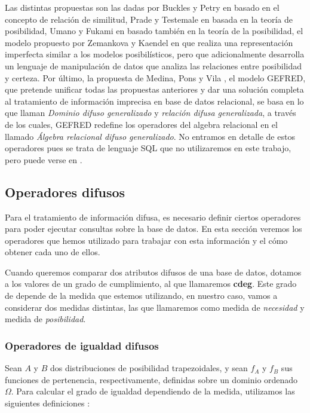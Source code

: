 Las distintas propuestas son las dadas por Buckles y Petry en \cite{buckles, buckles2, buckles3} basado en el concepto de relación de similitud, Prade y Testemale en \cite{prade, prade2, prade3, prade4} basada en la teoría de posibilidad, Umano y Fukami en \cite{fukami, fukami2, fukami3, fukami4} basado también en la teoría de la posibilidad, el modelo propuesto por Zemankova y Kaendel en \cite{zemankova, zemankova2} que realiza una representación imperfecta similar a los modelos posibilísticos, pero que adicionalmente desarrolla un lenguaje de manipulación de datos que analiza las relaciones entre posibilidad y certeza. Por último, la propuesta de Medina, Pons y Vila \cite{gefred}, el modelo GEFRED, que pretende unificar todas las propuestas anteriores y dar una solución completa al tratamiento de información imprecisa en base de datos relacional, se basa en lo que llaman \textit{Dominio difuso generalizado} y \textit{relación difusa generalizada}, a través de los cuales, GEFRED redefine los operadores del algebra relacional en el llamado \textit{Álgebra relacional difuso generalizado}. No entramos en detalle de estos operadores pues se trata de lenguaje SQL que no utilizaremos en este trabajo, pero puede verse en \cite{gefred}.

\subsection{Operadores difusos}\label{cdeg}

Para el tratamiento de información difusa, es necesario definir ciertos operadores para poder ejecutar consultas sobre la base de datos. En esta sección veremos los operadores que hemos utilizado para trabajar con esta información y el cómo obtener cada uno de ellos.

Cuando queremos comparar dos atributos difusos de una base de datos, dotamos a los valores de un grado de cumplimiento, al que llamaremos \textbf{cdeg}. Este grado de depende de la medida que estemos utilizando, en nuestro caso, vamos a considerar dos medidas distintas, las que llamaremos como medida de \textit{necesidad} y medida de \textit{posibilidad}.

\subsubsection{Operadores de igualdad difusos}

Sean $A$ y $B$ dos distribuciones de posibilidad trapezoidales, y sean $f_A$ y $f_B$ sus funciones de pertenencia, respectivamente, definidas sobre un dominio ordenado $\Omega$. Para calcular el grado de igualdad dependiendo de la medida, utilizamos las siguientes definiciones \cite{tesispepe}:

